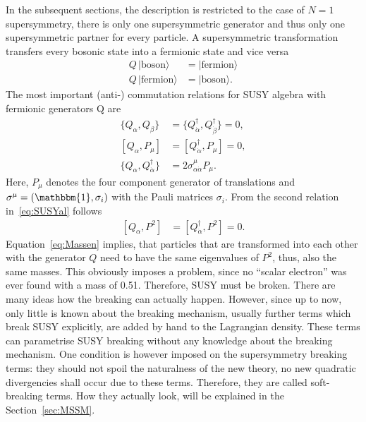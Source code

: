 In the subsequent sections, the description is restricted to the case of $N=1$ supersymmetry, \ie there is only one supersymmetric generator and thus only one supersymmetric partner for every particle.
A supersymmetric transformation transfers every bosonic state into a fermionic state and vice versa  
\begin{equation}
\begin{split}
 Q\, |\text{boson}\rangle  &= |\text{fermion}\rangle\\ 
 Q\, |\text{fermion}\rangle  &= |\text{boson}\rangle.
\end{split}
\end{equation}
The most important (anti-) commutation relations for SUSY algebra with fermionic generators Q are
\begin{align}
\label{eq:SUSYal}
 \{Q_{\alpha},Q_{\beta} \} &=  \{Q^{\dagger}_{\dot{\alpha}},Q^{\dagger}_{\dot{\beta}} \} = 0,\nonumber \\
   [Q_{\alpha} , P_{\mu}] &=  [Q^{\dagger}_{\dot{\alpha}}, P_{\mu}] = 0 ,\\
\{Q_{\alpha},  Q^{\dagger}_{\dot{\alpha}}\} &= 2 \sigma_{\alpha\dot{\alpha}}^{\mu} P_{\mu} \nonumber.
\end{align}
Here, $P_{\mu}$ denotes the four component generator of translations and $\sigma^{\mu} = \left( \mathbbm{1}, \sigma_i  \right)$ with the Pauli matrices $\sigma_i$.
From the second relation in~\eqref{eq:SUSYal} follows
\begin{align}
\label{eq:Massen}
 [Q_{\alpha} , P^2] &=  [Q^{\dagger}_{\dot{\alpha}}, P^2] = 0.
\end{align}
Equation~\ref{eq:Massen} implies, that particles that are transformed into each other with the generator $Q$ need to have the same eigenvalues of $P^2$, thus, also the same masses.
This obviously imposes a problem, since no ``scalar electron'' was ever found with a mass of 0.51\mev.
Therefore, SUSY must be broken.
There are many ideas how the breaking can actually happen.
However, since up to now, only little is known about the breaking mechanism, usually further terms which break SUSY explicitly, are added by hand to the Lagrangian density.
These terms can parametrise SUSY breaking without any knowledge about the breaking mechanism.
One condition is however imposed on the supersymmetry breaking terms: they should not spoil the naturalness of the new theory, \ie no new quadratic divergencies shall occur due to these terms.
Therefore, they are called soft-breaking terms.
How they actually look, will be explained in the Section~\ref{sec:MSSM}.

